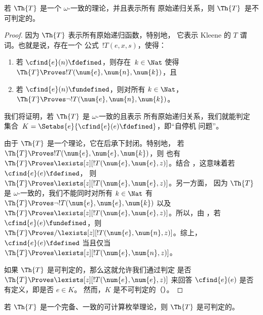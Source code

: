 \documentclass[../OpenLogic/include/open-logic-section]{subfiles}
\begin{document}

\begin{thm}
若 $\Th{T}$ 是一个 $\omega$-一致的理论，并且表示所有
原始递归关系，则 $\Th{T}$~是不可判定的。
\end{thm}

\begin{proof}
因为 $\Th{T}$ 表示所有原始递归函数，特别地，
它表示 Kleene 的 $T$ 谓词。也就是说，存在一个
公式~$!T(e, x, s)$，使得：
\begin{enumerate}
\item{} 若 $\cfind{e}(n) \fdefined$，则存在~$k \in \Nat$ 使得
$\Th{T} \Proves !T(\num{e}, \num{n}, \num{k})$，且
\item{} 若 $\cfind{e}(n) \fundefined$，则对所有 $k \in \Nat$，
$\Th{T} \Proves \lnot !T(\num{e}, \num{n}, \num{k})$。
\end{enumerate}
我们将证明，若 $\Th{T}$ 是 $\omega$-一致的且表示
所有原始递归关系，我们就能判定
集合~$K = \Setabs{e}{\cfind{e}(e) \fdefined}$，即“自停机
问题”。

由于 $\Th{T}$ 是一个理论，它在后承下封闭。特别地，
若 $\Th{T} \Proves !T(\num{e}, \num{e}, \num{k})$，则
也有 $\Th{T} \Proves \lexists[z][!T(\num{e}, \num{e}, z)]$。结合
，这意味着若 $\cfind{e}(e) \fdefined$，
则 $\Th{T} \Proves \lexists[z][!T(\num{e}, \num{e}, z)]$。另一方面，
因为 $\Th{T}$ 是 $\omega$-一致的，我们不能同时对所有
$k \in \Nat$ 有 $\Th{T} \Proves \lnot !T(\num{e}, \num{e}, \num{k})$ 以及
$\Th{T} \Proves \lexists[z][!T(\num{e}, \num{e},
  z)]$。所以，由 ，若 $\cfind{e}(e) \fundefined$，则 $\Th{T} \Proves/
  \lexists[z][!T(\num{e}, \num{n}, z)]$。综上，
$\cfind{e}(e) \fdefined$ 当且仅当 $\Th{T} \Proves \lexists[z][!T(\num{e},
  \num{n}, z)]$。

如果 $\Th{T}$ 是可判定的，那么这就允许我们通过判定
是否 $\Th{T} \Proves \lexists[z][!T(\num{e}, \num{e}, z)]$ 来回答
$\cfind{e}(e)$ 是否有定义，即是否 $e \in K$。
然而，$K$ 是不可判定的（）。
\end{proof}

\begin{thm}
  若\/ $\Th{T}$ 是一个完备、一致的可计算枚举理论，则
  $\Th{T}$ 是可判定的。
\end{thm}
\end{document}
